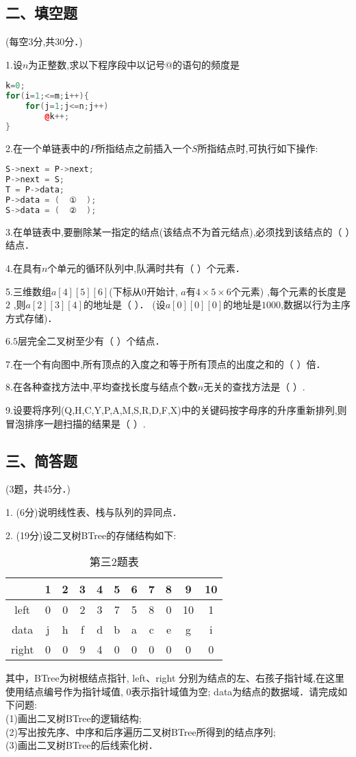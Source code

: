 \subsection{二、填空题}
(每空3分,共30分．)

1.设$n$为正整数,求以下程序段中以记号@的语句的频度是 \\
\begin{lstlisting}[language=cpp]
k=0;
for(i=1;<=m;i++){
    for(j=1;j<=n;j++)
        @k++;
}
\end{lstlisting}

2.在一个单链表中的$P$所指结点之前插入一个$S$所指结点时,可执行如下操作:  \\
\begin{lstlisting}[language=cpp]
S->next = P->next;
P->next = S;
T = P->data;
P->data = (  ①  );
S->data = (  ②  );
\end{lstlisting}

3.在单链表中,要删除某一指定的结点(该结点不为首元结点),必须找到该结点的（    ）结点．

4.在具有$n$个单元的循环队列中,队满时共有（    ）个元素．

5.三维数组$a[4][5][6]$(下标从$0$开始计, $a$有$4\times5\times6$个元素) ,每个元素的长度是$2$ ,则$a[2][3][4]$的地址是（    ）． (设$a[0][0][0]$的地址是$1000$,数据以行为主序方式存储)．

6.$5$层完全二叉树至少有（    ）个结点．

7.在一个有向图中,所有顶点的入度之和等于所有顶点的出度之和的（    ）倍．

8.在各种查找方法中,平均查找长度与结点个数$n$无关的查找方法是（    ）.

9.设要将序列(Q,H,C,Y,P,A,M,S,R,D,F,X)中的关键码按字母序的升序重新排列,则冒泡排序一趟扫描的结果是（    ）.

\subsection{三、简答题}
(3题，共45分．)

1. (6分)说明线性表、栈与队列的异同点．

2. (19分)设二叉树BTree的存储结构如下:
\begin{table}[ht]
\centering
\caption{第三2题表}\label{ZSDS11_tab1}
\begin{tabular}{|c|c|c|c|c|c|c|c|c|c|c|}
\hline
 & 1 & 2 & 3 & 4 & 5 & 6 & 7 & 8 & 9 & 10 \\
\hline
left & 0 & 0 & 2 & 3 & 7 & 5 & 8 & 0 & 10 & 1 \\
\hline
data & j & h & f & d & b & a & c & e & g & i \\
\hline
right & 0 & 0 & 9 & 4 & 0 & 0 & 0 & 0 & 0 & 0 \\
\hline
\end{tabular}
\end{table}
其中，BTree为树根结点指针, left、right 分别为结点的左、右孩子指针域,在这里使用结点编号作为指针域值, 0表示指针域值为空; data为结点的数据域．请完成如下问题: \\
(1)画出二叉树BTree的逻辑结构; \\
(2)写出按先序、中序和后序遍历二叉树BTree所得到的结点序列; \\
(3)画出二叉树BTree的后线索化树．

